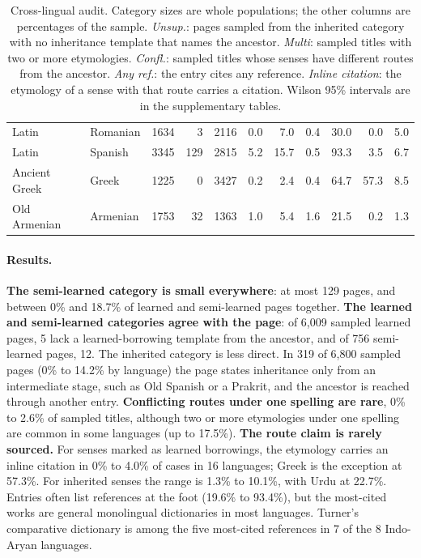 \documentclass[11pt]{article}
\begin{document}
\begin{table}[t]
\begin{tabular}{llrrrrrrrrr}
Latin & Romanian & 1634 & 3 & 2116 & 0.0 & 7.0 & 0.4 & 30.0 & 0.0 & 5.0 \\
Latin & Spanish & 3345 & 129 & 2815 & 5.2 & 15.7 & 0.5 & 93.3 & 3.5 & 6.7 \\
\midrule
Ancient Greek & Greek & 1225 & 0 & 3427 & 0.2 & 2.4 & 0.4 & 64.7 & 57.3 & 8.5 \\
\midrule
Old Armenian & Armenian & 1753 & 32 & 1363 & 1.0 & 5.4 & 1.6 & 21.5 & 0.2 & 1.3 \\
\bottomrule
\end{tabular}
\caption{Cross-lingual audit. Category sizes are whole populations; the other columns are percentages of the sample. \textit{Unsup.}: pages sampled from the inherited category with no inheritance template that names the ancestor. \textit{Multi}: sampled titles with two or more etymologies. \textit{Confl.}: sampled titles whose senses have different routes from the ancestor. \textit{Any ref.}: the entry cites any reference. \textit{Inline citation}: the etymology of a sense with that route carries a citation. Wilson 95\% intervals are in the supplementary tables.}
\label{tab:audit}
\end{table}

\paragraph{Results.} \textbf{The semi-learned category is small everywhere}: at most 129 pages, and between 0\% and 18.7\% of learned and semi-learned pages together. \textbf{The learned and semi-learned categories agree with the page}: of 6,009 sampled learned pages, 5 lack a learned-borrowing template from the ancestor, and of 756 semi-learned pages, 12. The inherited category is less direct. In 319 of 6,800 sampled pages (0\% to 14.2\% by language) the page states inheritance only from an intermediate stage, such as Old Spanish or a Prakrit, and the ancestor is reached through another entry. \textbf{Conflicting routes under one spelling are rare}, 0\% to 2.6\% of sampled titles, although two or more etymologies under one spelling are common in some languages (up to 17.5\%). \textbf{The route claim is rarely sourced.} For senses marked as learned borrowings, the etymology carries an inline citation in 0\% to 4.0\% of cases in 16 languages; Greek is the exception at 57.3\%. For inherited senses the range is 1.3\% to 10.1\%, with Urdu at 22.7\%. Entries often list references at the foot (19.6\% to 93.4\%), but the most-cited works are general monolingual dictionaries in most languages. Turner's comparative dictionary is among the five most-cited references in 7 of the 8 Indo-Aryan languages.
\end{document}
